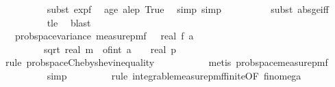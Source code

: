 \begin{isabellebody}
\ \ \ \ \ \ \ \ \isamarkupfalse%
\ {\isacharparenleft}{\kern0pt}subst\ exp{\isacharunderscore}{\kern0pt}f{\isacharparenright}{\kern0pt}\ \isamarkupfalse%
\ a{\isacharunderscore}{\kern0pt}ge{\isacharunderscore}{\kern0pt}{}\ a{\isacharunderscore}{\kern0pt}le{\isacharunderscore}{\kern0pt}p\ True\ \isamarkupfalse%
\ {\isacharparenleft}{\kern0pt}simp{\isacharcomma}{\kern0pt}\ simp{\isacharparenright}{\kern0pt}\isanewline
\ \ \ \ \ \ \ \ \isamarkupfalse%
\ {\isacharparenleft}{\kern0pt}subst\ abs{\isacharunderscore}{\kern0pt}ge{\isacharunderscore}{\kern0pt}iff{\isacharparenright}{\kern0pt}\isanewline
\ \ \ \ \ \ \ \ \isamarkupfalse%
\ t{\isacharunderscore}{\kern0pt}le\ \isamarkupfalse%
\ blast\isanewline
\ \ \ \ \isamarkupfalse%
\isanewline
\ \ \ \ \isamarkupfalse%
\ \isamarkupfalse%
\ {\isachardoublequoteopen}{\isachardot}{\kern0pt}{\isachardot}{\kern0pt}{\isachardot}{\kern0pt}\ {\isasymle}\ prob{\isacharunderscore}{\kern0pt}space{\isachardot}{\kern0pt}variance\ {\isacharparenleft}{\kern0pt}measure{\isacharunderscore}{\kern0pt}pmf\ {\isasymOmega}\ {\isacharparenleft}{\kern0pt}{\isasymlambda}{\isasymomega}{\isachardot}{\kern0pt}\ real\ {\isacharparenleft}{\kern0pt}f\ a\ {\isasymomega}{\isacharparenright}{\kern0pt}{\isacharparenright}{\kern0pt}\ \isanewline
\ \ \ \ \ \ {\isacharslash}{\kern0pt}\ {\isacharparenleft}{\kern0pt}{}\ {\isacharasterisk}{\kern0pt}\ sqrt\ {\isacharparenleft}{\kern0pt}real\ m\ {\isacharasterisk}{\kern0pt}\ {\isacharparenleft}{\kern0pt}of{\isacharunderscore}{\kern0pt}int\ a\ {\isacharplus}{\kern0pt}\ {}{\isacharparenright}{\kern0pt}\ {\isacharslash}{\kern0pt}\ real\ p{\isacharparenright}{\kern0pt}{\isacharparenright}{\kern0pt}\isanewline
\ \ \ \ \ \ \isamarkupfalse%
\ {\isacharparenleft}{\kern0pt}rule\ prob{\isacharunderscore}{\kern0pt}space{\isachardot}{\kern0pt}Chebyshev{\isacharunderscore}{\kern0pt}inequality{\isacharparenright}{\kern0pt}\isanewline
\ \ \ \ \ \ \ \ \ \isamarkupfalse%
\ {\isacharparenleft}{\kern0pt}metis\ prob{\isacharunderscore}{\kern0pt}space{\isacharunderscore}{\kern0pt}measure{\isacharunderscore}{\kern0pt}pmf{\isacharparenright}{\kern0pt}\isanewline
\ \ \ \ \ \ \ \ \isamarkupfalse%
\ simp\isanewline
\ \ \ \ \ \ \ \isamarkupfalse%
\ {\isacharparenleft}{\kern0pt}rule\ integrable{\isacharunderscore}{\kern0pt}measure{\isacharunderscore}{\kern0pt}pmf{\isacharunderscore}{\kern0pt}finite{\isacharbrackleft}{\kern0pt}OF\ fin{\isacharunderscore}{\kern0pt}omega{\isacharunderscore}{\kern0pt}{}{\isacharbrackright}{\kern0pt}{\isacharparenright}{\kern0pt}\isanewline

\end{isabellebody}
